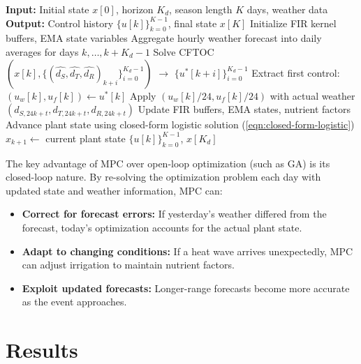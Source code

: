 \documentclass[pdflatex,sn-mathphys-num]{sn-jnl}
\begin{document}
\begin{algorithm}[!htbp]
\caption{Model Predictive Control for Irrigation and Fertilization}
\label{alg:mpc}
\begin{algorithmic}[1]
\State \textbf{Input:} Initial state $x[0]$, horizon $K_{d}$, season length $K$ days, weather data
\State \textbf{Output:} Control history $\{u[k]\}_{k=0}^{K-1}$, final state $x[K]$
\State
\State Initialize FIR kernel buffers, EMA state variables
    \State Aggregate hourly weather forecast into daily averages for days $k, \ldots, k+K_{d}-1$
    \State Solve CFTOC$(x[k], \{(\hat{d_{S}}, \hat{d_{T}}, \hat{d_{R}})_{k+i}\}_{i=0}^{K_{d}-1})$ $\rightarrow$ $\{u^*[k+i]\}_{i=0}^{K_{d}-1}$
    \State Extract first control: $(u_{w}[k], u_{f}[k]) \leftarrow u^*[k]$
     
        \State Apply $(u_{w}[k]/24, u_{f}[k]/24)$ with actual weather $(d_{S, 24k+t}, d_{T, 24k+t}, d_{R, 24k+t})$
        \State Update FIR buffers, EMA states, nutrient factors
        \State Advance plant state using closed-form logistic solution (\ref{eqn:closed-form-logistic})
    \EndFor
    \State $x_{k+1} \leftarrow$ current plant state
\EndFor
\State \Return $\{u[k]\}_{k=0}^{K-1}$, $x[K_{d}]$
\end{algorithmic}
\end{algorithm}

The key advantage of MPC over open-loop optimization (such as GA) is its closed-loop nature. By re-solving the optimization problem each day with updated state and weather information, MPC can:
\begin{itemize}
\item \textbf{Correct for forecast errors:} If yesterday's weather differed from the forecast, today's optimization accounts for the actual plant state.
\item \textbf{Adapt to changing conditions:} If a heat wave arrives unexpectedly, MPC can adjust irrigation to maintain nutrient factors.
\item \textbf{Exploit updated forecasts:} Longer-range forecasts become more accurate as the event approaches.
\end{itemize}

\section{Results}\label{sec:results}
\end{document}
